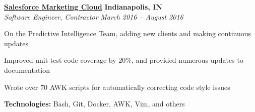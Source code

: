 %
    \headerrow
        {\textbf{\href{https://www.marketingcloud.com/}{Salesforce Marketing Cloud}}}
        {\textbf{Indianapolis, IN}}
    \\
    \headerrow
        {\emph{Software Engineer, Contractor}}
        {\emph{March 2016 -- August 2016}}
    \begin{itemize*}
        \item On the Predictive Intelligence Team, adding new clients and making continuous updates
        \item Improved unit test code coverage by 20\%, and provided numerous updates to documentation
        \item Wrote over 70 AWK scripts for automatically correcting code style issues
    \end{itemize*}

    \hspace{1.0em}
    \textbf{Technologies:} Bash, Git, Docker, AWK, Vim, and others
